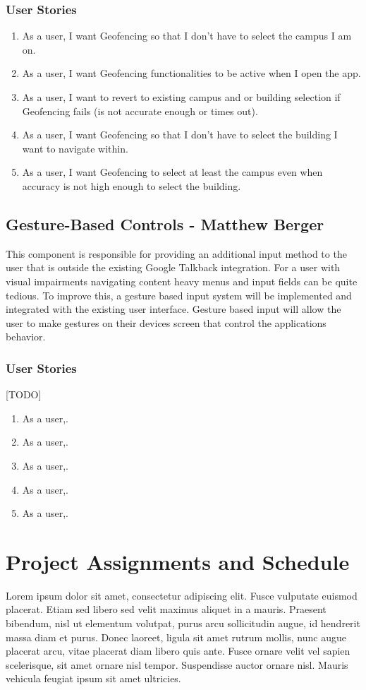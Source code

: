 \documentclass{scrreprt}
\begin{document}
\subsection{User Stories}
\begin{enumerate}
	\item As a user, I want Geofencing so that I don't have to select the campus I am on.
	\item As a user, I want Geofencing functionalities to be active when I open the app.
	\item As a user, I want to revert to existing campus and or building selection if Geofencing fails (is not accurate enough or times out).
	\item As a user, I want Geofencing so that I don't have to select the building I want to navigate within.
	\item As a user, I want Geofencing to select at least the campus even when accuracy is not high enough to select the building.
\end{enumerate}

\section{Gesture-Based Controls - Matthew Berger}
This component is responsible for providing an additional input method to the user that is outside the existing Google Talkback integration. For a user with visual impairments navigating content heavy menus and input fields can be quite tedious. To improve this, a gesture based input system will be implemented and integrated with the existing user interface. Gesture based input will allow the user to make gestures on their devices screen that control the applications behavior.

\subsection{User Stories} [TODO]
\begin{enumerate}
	\item As a user,.
	\item As a user,.
	\item As a user,.
	\item As a user,.
	\item As a user,.
\end{enumerate}

\chapter{Project Assignments and Schedule}
Lorem ipsum dolor sit amet, consectetur adipiscing elit. Fusce vulputate euismod placerat. Etiam sed libero sed velit maximus aliquet in a mauris. Praesent bibendum, nisl ut elementum volutpat, purus arcu sollicitudin augue, id hendrerit massa diam et purus. Donec laoreet, ligula sit amet rutrum mollis, nunc augue placerat arcu, vitae placerat diam libero quis ante. Fusce ornare velit vel sapien scelerisque, sit amet ornare nisl tempor. Suspendisse auctor ornare nisl. Mauris vehicula feugiat ipsum sit amet ultricies.
\end{document}
